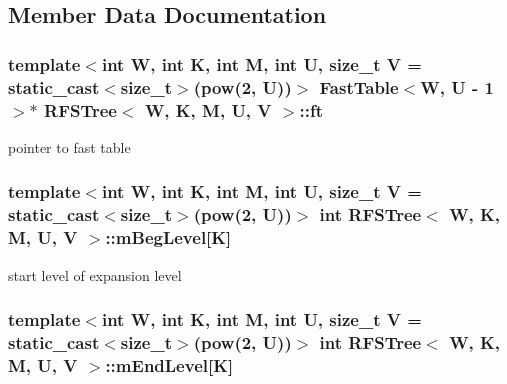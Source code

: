 \subsection{Member Data Documentation}
\hypertarget{classRFSTree_a68bb77f190f0648bf1c4ed69da42b9f4}{
\subsubsection[{ft}]{\setlength{\rightskip}{0pt plus 5cm}template$<$int W, int K, int M, int U, size\-\_\-t V = static\-\_\-cast$<$size\-\_\-t$>$(pow(2, U))$>$ {\bf Fast\-Table}$<${\bf W}, U -\/ 1$>$$\ast$ {\bf R\-F\-S\-Tree}$<$ {\bf W}, K, M, U, V $>$\-::ft\hspace{0.3cm}{\ttfamily [private]}}}\label{classRFSTree_a68bb77f190f0648bf1c4ed69da42b9f4}


pointer to fast table 

\hypertarget{classRFSTree_a73a0204caef560c7075a52c5a9cd54aa}{
\subsubsection[{m\-Beg\-Level}]{\setlength{\rightskip}{0pt plus 5cm}template$<$int W, int K, int M, int U, size\-\_\-t V = static\-\_\-cast$<$size\-\_\-t$>$(pow(2, U))$>$ int {\bf R\-F\-S\-Tree}$<$ {\bf W}, K, M, U, V $>$\-::m\-Beg\-Level\mbox{[}K\mbox{]}\hspace{0.3cm}{\ttfamily [private]}}}\label{classRFSTree_a73a0204caef560c7075a52c5a9cd54aa}


start level of expansion level 

\hypertarget{classRFSTree_ab54baf6241f9d89e388f1d06ca1a1122}{
\subsubsection[{m\-End\-Level}]{\setlength{\rightskip}{0pt plus 5cm}template$<$int W, int K, int M, int U, size\-\_\-t V = static\-\_\-cast$<$size\-\_\-t$>$(pow(2, U))$>$ int {\bf R\-F\-S\-Tree}$<$ {\bf W}, K, M, U, V $>$\-::m\-End\-Level\mbox{[}K\mbox{]}\hspace{0.3cm}{\ttfamily [private]}}}\label{classRFSTree_ab54baf6241f9d89e388f1d06ca1a1122}



